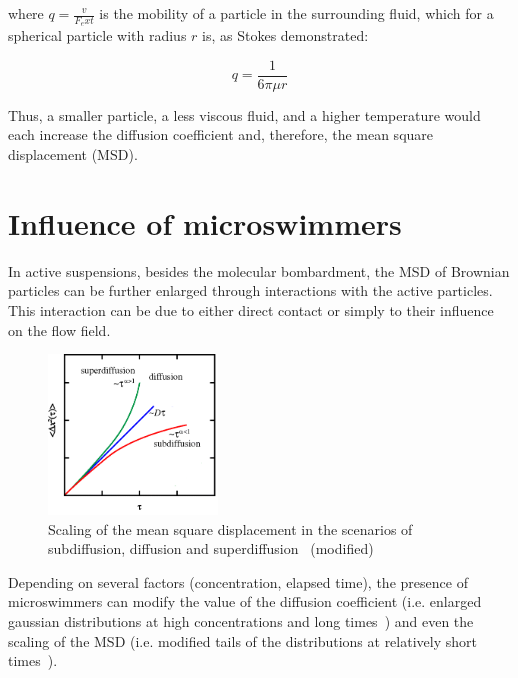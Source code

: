 where $q = \frac{v}{F_ext}$ is the mobility of a particle in the surrounding fluid, which for a spherical particle with radius $r$ is, as Stokes demonstrated: 

\begin{equation}
q=\frac{1}{6 \pi \mu r}
\end{equation}

Thus, a smaller particle, a less viscous fluid, and a higher temperature would each increase the diffusion coefficient and, therefore, the mean square displacement (MSD). 

\section{Influence of microswimmers}

In active suspensions, besides the molecular bombardment, the MSD of Brownian particles can be further enlarged through interactions with the active particles. This interaction can be due to either direct contact or simply to their influence on the flow field.

\begin{figure}[H]
	\centering
	\includegraphics[width=0.4\textwidth]{archivos/SubSuperDif.png}
	\caption{Scaling of the mean square displacement in the scenarios of subdiffusion, diffusion and superdiffusion~\cite{MacKintosh7138} (modified)}
	\label{SSDif}
\end{figure}

Depending on several factors (concentration, elapsed time), the presence of microswimmers can modify the value of the diffusion coefficient (i.e. enlarged gaussian distributions at high concentrations and long times~\cite{Kurtuldu2011}) and even the scaling of the MSD (i.e. modified tails of the distributions at relatively short times~\cite{Kurtuldu2011}). 